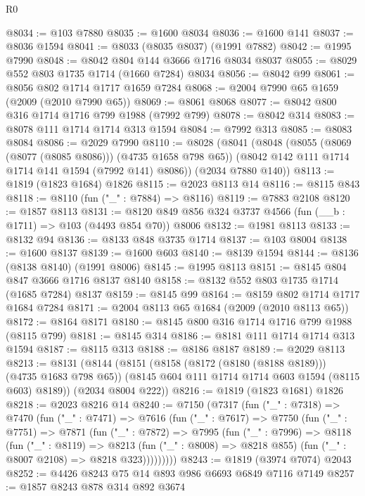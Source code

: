 \begin{lexlean}{R0}
\begin{coremodule}
@8034 := @103 @7880
@8035 := @1600 @8034
@8036 := @1600 @141
@8037 := @8036 @1594
@8041 := @8033 (@8035 @8037) (@1991 @7882)
@8042 := @1995 @7990
@8048 := @8042 @804 @144 @3666 @1716 @8034 @8037
@8055 := @8029 @552 @803 @1735 @1714 (@1660 @7284) @8034
@8056 := @8042 @99
@8061 := @8056 @802 @1714 @1717 @1659 @7284
@8068 := @2004 @7990 @65 @1659 (@2009 (@2010 @7990 @65))
@8069 := @8061 @8068
@8077 := @8042 @800 @316 @1714 @1716 @799 @1988 (@7992 @799)
@8078 := @8042 @314
@8083 := @8078 @111 @1714 @1714 @313 @1594
@8084 := @7992 @313
@8085 := @8083 @8084
@8086 := @2029 @7990
@8110 := @8028
    (@8041
      (@8048
        (@8055 (@8069 (@8077 (@8085 @8086))) (@4735 @1658 @798 @65))
        (@8042 @142 @111 @1714 @1714 @141 @1594 (@7992 @141) @8086))
      (@2034 @7880 @140))
@8113 := @1819 (@1823 @1684) @1826
@8115 := @2023 @8113 @14
@8116 := @8115 @843
@8118 := @8110 (fun ("_" : @7884) => @8116)
@8119 := @7883 @2108
@8120 := @1857 @8113
@8131 := @8120 @849 @856 @324 @3737 @4566 (fun (__b : @1711) => @103 (@4493 @854 @70)) @8006
@8132 := @1981 @8113
@8133 := @8132 @94
@8136 := @8133 @848 @3735 @1714
@8137 := @103 @8004
@8138 := @1600 @8137
@8139 := @1600 @603
@8140 := @8139 @1594
@8144 := @8136 (@8138 @8140) (@1991 @8006)
@8145 := @1995 @8113
@8151 := @8145 @804 @847 @3666 @1716 @8137 @8140
@8158 := @8132 @552 @803 @1735 @1714 (@1685 @7284) @8137
@8159 := @8145 @99
@8164 := @8159 @802 @1714 @1717 @1684 @7284
@8171 := @2004 @8113 @65 @1684 (@2009 (@2010 @8113 @65))
@8172 := @8164 @8171
@8180 := @8145 @800 @316 @1714 @1716 @799 @1988 (@8115 @799)
@8181 := @8145 @314
@8186 := @8181 @111 @1714 @1714 @313 @1594
@8187 := @8115 @313
@8188 := @8186 @8187
@8189 := @2029 @8113
@8213 := @8131
    (@8144
      (@8151
        (@8158 (@8172 (@8180 (@8188 @8189))) (@4735 @1683 @798 @65))
        (@8145 @604 @111 @1714 @1714 @603 @1594 (@8115 @603) @8189))
      (@2034 @8004 @222))
@8216 := @1819 (@1823 @1681) @1826
@8218 := @2023 @8216 @14
@8240 := @7150
    (@7317
      (fun ("_" : @7318) =>
      @7470
        (fun ("_" : @7471) =>
        @7616
          (fun ("_" : @7617) =>
          @7750
            (fun ("_" : @7751) =>
            @7871
              (fun ("_" : @7872) =>
              @7995
                (fun ("_" : @7996) =>
                @8118
                  (fun ("_" : @8119) =>
                  @8213
                    (fun ("_" : @8008) => @8218 @855)
                    (fun ("_" : @8007 @2108) => @8218 @323)))))))))
@8243 := @1819 (@3974 @7074) @2043
@8252 := @4426 @8243 @75 @14 @893 @986 @6693 @6849 @7116 @7149
@8257 := @1857 @8243 @878 @314 @892 @3674

\end{coremodule}
\end{lexlean}

